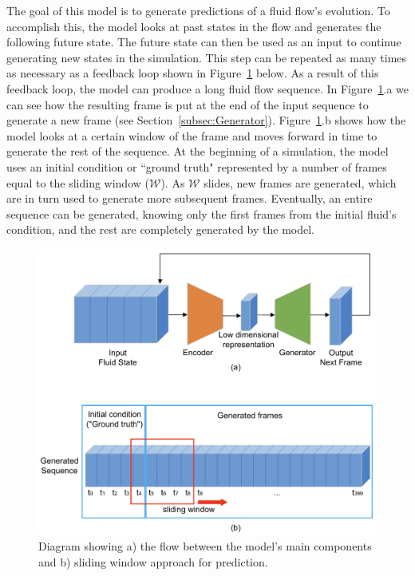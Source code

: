 The goal of this model is to generate predictions of a fluid flow's evolution. To accomplish this, the model looks at past states in the flow and generates the following future state. The future state can then be used as an input to continue generating new states in the simulation. This step can be repeated as many times as necessary as a feedback loop shown in Figure~\ref{fig:feedback_loop} below. As a result of this feedback loop, the model can produce a long fluid flow sequence. In Figure~\ref{fig:feedback_loop}.a we can see how the resulting frame is put at the end of the input sequence to generate a new frame (see Section~\ref{subsec:Generator}). Figure~\ref{fig:feedback_loop}.b shows how the model looks at a certain window of the frame and moves forward in time to generate the rest of the sequence. At the beginning of a simulation, the model uses an initial condition or ``ground truth" represented by a number of frames equal to the sliding window ($\mathcal{W}$). As $\mathcal{W}$ slides, new frames are generated, which are in turn used to generate more subsequent frames. Eventually, an entire sequence can be generated, knowing only the first frames from the initial fluid's condition, and the rest are completely generated by the model.

\begin{figure}[!htbp]
    \centering
    \includegraphics[width=1\linewidth]{images/feedback_loop.png}
    \caption{Diagram showing a) the flow between the model's main components and b) sliding window approach for prediction.}
    \label{fig:feedback_loop}
\end{figure}

